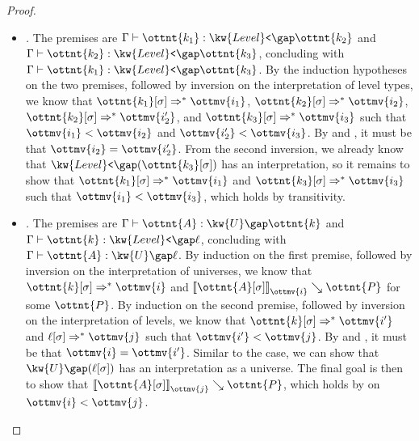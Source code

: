 \documentclass[a4paper,UKenglish,cleveref,autoref,thm-restate]{lipics-v2021}
\begin{document}
\begin{proof}
\begin{itemize}[topsep=0pt]
    \item \textit{.}
      The premises are $ \Gamma  \vdash  \ottnt{k_{{\mathrm{1}}}}  \mathrel{:}   \kw{Level}\texttt{<} \gap  \ottnt{k_{{\mathrm{2}}}}  $ and $ \Gamma  \vdash  \ottnt{k_{{\mathrm{2}}}}  \mathrel{:}   \kw{Level}\texttt{<} \gap  \ottnt{k_{{\mathrm{3}}}}  $,
      concluding with $ \Gamma  \vdash  \ottnt{k_{{\mathrm{1}}}}  \mathrel{:}   \kw{Level}\texttt{<} \gap  \ottnt{k_{{\mathrm{3}}}}  $.
      By the induction hypotheses on the two premises,
      followed by inversion on the interpretation of level types,
      we know that $  \ottnt{k_{{\mathrm{1}}}} [  \sigma  ]   \Rightarrow^\ast   \ottmv{i_{{\mathrm{1}}}}  $, $  \ottnt{k_{{\mathrm{2}}}} [  \sigma  ]   \Rightarrow^\ast   \ottmv{i_{{\mathrm{2}}}}  $, $  \ottnt{k_{{\mathrm{2}}}} [  \sigma  ]   \Rightarrow^\ast   \ottmv{i'_{{\mathrm{2}}}}  $, and $  \ottnt{k_{{\mathrm{3}}}} [  \sigma  ]   \Rightarrow^\ast   \ottmv{i_{{\mathrm{3}}}}  $
      such that $ \ottmv{i_{{\mathrm{1}}}}  <  \ottmv{i_{{\mathrm{2}}}} $ and $ \ottmv{i'_{{\mathrm{2}}}}  <  \ottmv{i_{{\mathrm{3}}}} $.
      By  and ,
      it must be that $\ottmv{i_{{\mathrm{2}}}} = \ottmv{i'_{{\mathrm{2}}}}$.
      From the second inversion, we already know that $ \kw{Level}\texttt{<} \gap   (  \ottnt{k_{{\mathrm{3}}}} [  \sigma  ]  )  $ has an interpretation,
      so it remains to show that $  \ottnt{k_{{\mathrm{1}}}} [  \sigma  ]   \Rightarrow^\ast   \ottmv{i_{{\mathrm{1}}}}  $ and $  \ottnt{k_{{\mathrm{3}}}} [  \sigma  ]   \Rightarrow^\ast   \ottmv{i_{{\mathrm{3}}}}  $ such that $ \ottmv{i_{{\mathrm{1}}}}  <  \ottmv{i_{{\mathrm{3}}}} $,
      which holds by transitivity.
    \item \textit{.}
      The premises are $ \Gamma  \vdash  \ottnt{A}  \mathrel{:}   \kw{U} \gap  \ottnt{k}  $ and $ \Gamma  \vdash  \ottnt{k}  \mathrel{:}   \kw{Level}\texttt{<} \gap  \ell  $,
      concluding with $ \Gamma  \vdash  \ottnt{A}  \mathrel{:}   \kw{U} \gap  \ell  $.
      By induction on the first premise,
      followed by inversion on the interpretation of universes,
      we know that $  \ottnt{k} [  \sigma  ]   \Rightarrow^\ast   \ottmv{i}  $ and $ \mathopen{\llbracket}   \ottnt{A} [  \sigma  ]   \mathclose{\rrbracket}_{ \ottmv{i} } \searrow  \ottnt{P} $ for some $\ottnt{P}$.
      By induction on the second premise,
      followed by inversion on the interpretation of levels,
      we know that $  \ottnt{k} [  \sigma  ]   \Rightarrow^\ast   \ottmv{i'}  $ and $  \ell [  \sigma  ]   \Rightarrow^\ast   \ottmv{j}  $ such that $ \ottmv{i'}  <  \ottmv{j} $.
      By  and ,
      it must be that $\ottmv{i} = \ottmv{i'}$.
      Similar to the  case,
      we can show that $ \kw{U} \gap   (  \ell [  \sigma  ]  )  $ has an interpretation as a universe.
      The final goal is then to show that $ \mathopen{\llbracket}   \ottnt{A} [  \sigma  ]   \mathclose{\rrbracket}_{ \ottmv{j} } \searrow  \ottnt{P} $,
      which holds by  on $ \ottmv{i}  <  \ottmv{j} $.
      \qedhere
  \end{itemize}
\end{proof}
\end{document}
